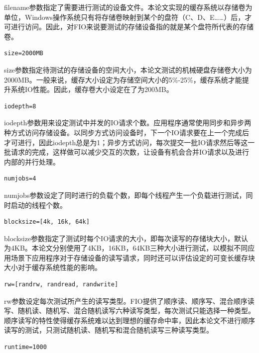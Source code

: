 filename参数指定了需要进行测试的设备文件。本论文实现的缓存系统以存储卷为单位，Windows操作系统只有将存储卷映射到某个的盘符（C、D、E……）后，才可进行访问。因此，对FIO来说要测试的存储设备指的就是某个盘符所代表的存储卷。

\begin{lstlisting}
size=2000MB
\end{lstlisting}

size参数指定待测试的存储设备的空间大小，本论文测试的机械硬盘存储卷大小为2000MB。一般来说，缓存大小设定为存储空间大小的5\%-25\%，缓存系统才能提升系统IO性能。因此，缓存卷大小设定在了为200MB。

\begin{lstlisting}
iodepth=8
\end{lstlisting}

iodepth参数用来设定测试中并发的IO请求个数。应用程序通常使用同步和异步两种方式访问存储设备。以同步方式访问设备时，下一个IO请求要在上一个完成后才可进行，因此iodepth总是为1；异步方式访问，每次提交一批IO请求然后等这一批请求的完成，这样做可以减少交互的次数，让设备有机会合并IO请求以及进行内部的并行处理。

\begin{lstlisting}
numjobs=4
\end{lstlisting}

numjobs参数设定了同时进行的负载个数，即每个线程产生一个负载进行测试，同时启动的线程个数。

\begin{lstlisting}
blocksize=[4k, 16k, 64k]
\end{lstlisting}

blocksize参数指定了测试时每个IO请求的大小，即每次读写的存储块大小，默认为4KB。本论文分别使用了4KB，16KB，64KB三种大小进行测试，以模拟不同应用场景下应用程序对于存储设备的读写请求，同时还可以评估设定的可变长缓存块大小对于缓存系统性能的影响。

\begin{lstlisting}
rw=[randrw, randread, randwrite]
\end{lstlisting}

rw参数设定每次测试所产生的读写类型。FIO提供了顺序读、顺序写、混合顺序读写、随机读、随机写、混合随机读写六种读写类型，每次测试只能选择一种类型。顺序读写的特性使得缓存系统难以达到理想的缓存命中率，因此本论文不进行顺序读写的测试，只测试随机读、随机写和混合随机读写三种读写类型。

\begin{lstlisting}
runtime=1000
\end{lstlisting}

